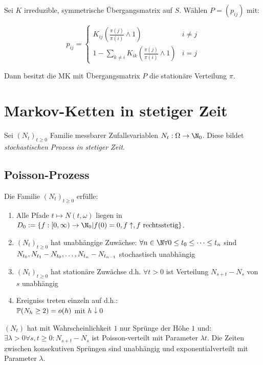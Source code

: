 Sei $K$ irreduzible, symmetrische Übergangsmatrix auf $S$. Wählen $P = (p_{ij})$ mit:

$$p_{ij} = \begin{cases} K_{ij}\left(\frac{\pi(j)}{\pi(i)} \land 1\right) & i \neq j \\ 1 - \sum_{k \neq i} K_{ik}\left(\frac{\pi(j)}{\pi(i)} \land 1\right) & i=j \end{cases}$$

Dann besitzt die MK mit Übergangsmatrix $P$ die stationäre Verteilung $\pi$.

\section*{Markov-Ketten in stetiger Zeit}

Sei $(N_t)_{t\geq 0}$ Familie messbarer Zufallsvariablen $N_t : \Omega \to \N_0$. Diese bildet \emph{stochastischen Prozess in stetiger Zeit}.

\subsection*{Poisson-Prozess}

Die Familie $(N_t)_{t\geq 0}$ erfülle:

\begin{enumerate}[label=(\alph*)]
	\item Alle Pfade $t \mapsto N(t,\omega)$ liegen in $D_0 := \{ f : [0,\infty) \to \N_0 | f(0) = 0, f \uparrow, f \text{ rechtsstetig}\}$.
	\item $(N_t)_{t\geq0}$ hat unabhängige Zuwächse: $\forall n \in \N \\ \forall 0 \leq t_0 \leq \cdots \leq t_n$ sind $N_{t_0}, N_{t_1}-N_{t_0}, \dots, \\ N_{t_n}-N_{t_{n-1}}$ stochastisch unabhängig
	\item $(N_t)_{t\geq0}$ hat stationäre Zuwächse d.h. $\forall t > 0$ ist Verteilung $N_{s+t}-N_s$ von $s$ unabhängig
	\item Ereigniss treten einzeln auf d.h.: \\ $\P(N_h \geq 2) = o(h)$ mit $h \downarrow 0$
\end{enumerate}

$(N_t)$ hat mit Wahrscheinlichkeit $1$ nur Sprünge der Höhe $1$ und: $\exists \lambda > 0 \forall s, t \geq 0 : N_{s+t}-N_s$ ist Poisson-verteilt mit Parameter $\lambda t$. Die Zeiten zwischen konsekutiven Sprüngen sind unabhängig und exponentialverteilt mit Parameter $\lambda$.

